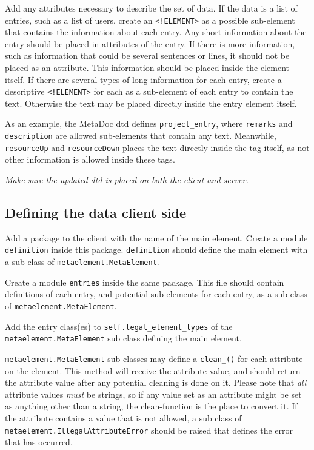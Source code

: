 Add any attributes necessary to describe the set of data. If the data is a list
of entries, such as a list of users, create an \texttt{<!ELEMENT>} as a
possible sub-element that contains the information about each entry. Any short
information about the entry should be placed in attributes of the entry. If
there is more information, such as information that could be several sentences
or lines, it should not be placed as an attribute. This information should be
placed inside the element itself. If there are several types of long
information for each entry, create a descriptive \texttt{<!ELEMENT>} for each
as a sub-element of each entry to contain the text. Otherwise the text may be
placed directly inside the entry element itself. 

As an example, the MetaDoc \gls{dtd} \cite{metadoc_dtd} defines
\texttt{project\_entry}, where \texttt{remarks} and \texttt{description} are
allowed sub-elements that contain any text. Meanwhile, \texttt{resourceUp} and
\texttt{resourceDown} places the text directly inside the tag itself, as not
other information is allowed inside these tags.

\textit{Make sure the updated \gls{dtd} is placed on both the client and
server.}

\subsection{Defining the data client side}
\label{sec:defclientmodel}
Add a package \cite{python_modules} to the client with the name of the main
element. Create a module \texttt{definition} inside this package.
\texttt{definition} should define the main element with a sub class of
\texttt{metaelement.MetaElement}.

Create a module \texttt{entries} inside the same package. This file should
contain definitions of each entry, and potential sub elements for each entry,
as a sub class of \texttt{metaelement.MetaElement}. 

Add the entry class(es) to \texttt{self.legal\_element\_types} of the \\ 
\texttt{metaelement.MetaElement} sub class defining the main element. 

\texttt{metaelement.MetaElement} sub classes may define a
\texttt{clean\_<attribute name>()} for each attribute on the element. This
method will receive the attribute value, and should return the attribute value
after any potential cleaning is done on it. Please note that \textit{all}
attribute values \textit{must} be strings, so if any value set as an attribute
might be set as anything other than a string, the clean-function is the place
to convert it. If the attribute contains a value that is not allowed, a sub
class of \texttt{metaelement.IllegalAttributeError} should be raised that
defines the error that has occurred. 

